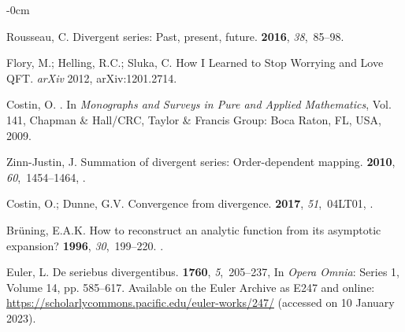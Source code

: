 \documentclass[axioms,article,accept,oneauthor,pdftex]{Definitions/mdpi}
\begin{document}
\begin{adjustwidth}{-\extralength}{0cm}
\begin{thebibliography}{999}
Rousseau, C.
\newblock Divergent series: {P}ast, present, future.
 {\bf
  2016}, {\em 38},~85--98.

Flory, M.; Helling, R.C.; Sluka, C.
\newblock How {I} Learned to Stop Worrying and Love {QFT}. \emph{arXiv} 2012, arXiv:1201.2714.

Costin, O.
.
\newblock  In {\em Monographs
  and Surveys in Pure and Applied Mathematics}, Vol. 141, Chapman \& Hall/CRC, Taylor \&
  Francis Group: Boca Raton, FL, USA, 2009.

Zinn-Justin, J.
\newblock Summation of divergent series: {O}rder-dependent mapping.
 {\bf 2010}, {\em 60},~1454--1464,
.

Costin, O.; Dunne, G.V.
\newblock  Convergence from divergence.
 {\bf
  2017}, {\em 51},~04LT01,
.

Br\"uning, E.A.K.
\newblock How to reconstruct an analytic function from its asymptotic
  expansion?
 {\bf 1996}, {\em 30},~199--220.
.

Euler, L.
\newblock De seriebus divergentibus.
 {\bf
  1760}, {\em 5},~205--237,
\newblock In \emph{Opera Omnia}: Series 1, Volume 14, pp. 585--617.
\newblock  Available on the Euler Archive as E247 and online: \url{https://scholarlycommons.pacific.edu/euler-works/247/}
\newblock (accessed on 10 January 2023).



\end{thebibliography}
\end{adjustwidth}
\end{document}
